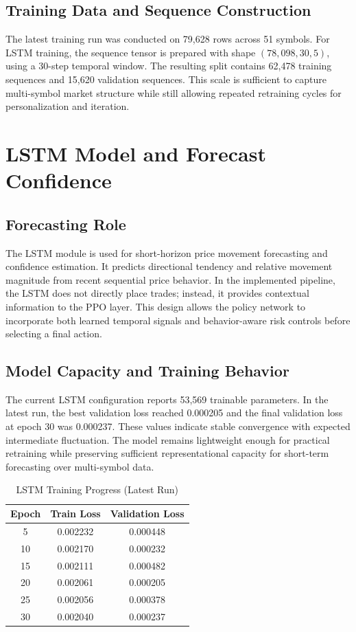 \subsection{Training Data and Sequence Construction}

The latest training run was conducted on 79,628 rows across 51 symbols. For LSTM training, the sequence tensor is prepared with shape \((78{,}098, 30, 5)\), using a 30-step temporal window. The resulting split contains 62,478 training sequences and 15,620 validation sequences. This scale is sufficient to capture multi-symbol market structure while still allowing repeated retraining cycles for personalization and iteration.

\section{LSTM Model and Forecast Confidence}

\subsection{Forecasting Role}

The LSTM module is used for short-horizon price movement forecasting and confidence estimation. It predicts directional tendency and relative movement magnitude from recent sequential price behavior. In the implemented pipeline, the LSTM does not directly place trades; instead, it provides contextual information to the PPO layer. This design allows the policy network to incorporate both learned temporal signals and behavior-aware risk controls before selecting a final action.

\subsection{Model Capacity and Training Behavior}

The current LSTM configuration reports 53,569 trainable parameters. In the latest run, the best validation loss reached 0.000205 and the final validation loss at epoch 30 was 0.000237. These values indicate stable convergence with expected intermediate fluctuation. The model remains lightweight enough for practical retraining while preserving sufficient representational capacity for short-term forecasting over multi-symbol data.

\begin{table}[h]
\centering
\caption{LSTM Training Progress (Latest Run)}
\begin{tabular}{|c|c|c|}
\hline
\textbf{Epoch} & \textbf{Train Loss} & \textbf{Validation Loss} \\
\hline
5  & 0.002232 & 0.000448 \\
10 & 0.002170 & 0.000232 \\
15 & 0.002111 & 0.000482 \\
20 & 0.002061 & 0.000205 \\
25 & 0.002056 & 0.000378 \\
30 & 0.002040 & 0.000237 \\
\hline
\end{tabular}
\end{table}

